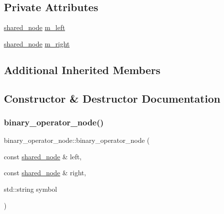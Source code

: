 \subsection*{Private Attributes}
\begin{DoxyCompactItemize}
\item 
\hyperlink{namespacejawe_a3f307481d921b6cbb50cc8511fc2b544}{shared\+\_\+node} \hyperlink{classjawe_1_1binary__operator__node_aadc5aa4653bff38e1f4f0110a36de63b}{m\+\_\+left}
\item 
\hyperlink{namespacejawe_a3f307481d921b6cbb50cc8511fc2b544}{shared\+\_\+node} \hyperlink{classjawe_1_1binary__operator__node_add4099a75e39ab3931d71b3d6e1032c8}{m\+\_\+right}
\end{DoxyCompactItemize}
\subsection*{Additional Inherited Members}


\subsection{Constructor \& Destructor Documentation}
\mbox{\label{classjawe_1_1binary__operator__node_a38237c97b9f17f6ba32b7e18c4795a99}} 
\subsubsection{\texorpdfstring{binary\+\_\+operator\+\_\+node()}{binary\_operator\_node()}}
{\footnotesize\ttfamily binary\+\_\+operator\+\_\+node\+::binary\+\_\+operator\+\_\+node (\begin{DoxyParamCaption}\item[{const \hyperlink{namespacejawe_a3f307481d921b6cbb50cc8511fc2b544}{shared\+\_\+node} \&}]{left,  }\item[{const \hyperlink{namespacejawe_a3f307481d921b6cbb50cc8511fc2b544}{shared\+\_\+node} \&}]{right,  }\item[{std\+::string}]{symbol }\end{DoxyParamCaption})}



